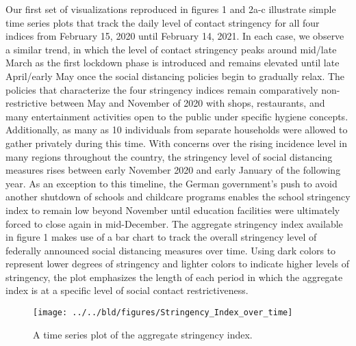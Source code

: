 Our first set of visualizations reproduced in figures 1 and 2a-c illustrate simple time series plots that track the daily level of contact stringency for all four indices from February 15, 2020 until February 14, 2021. In each case, we observe a similar trend, in which the level of contact stringency peaks around mid/late March as the first lockdown phase is introduced and remains elevated until late April/early May once the social distancing policies begin to gradually relax. The policies that characterize the four stringency indices remain comparatively non-restrictive between May and November of 2020 with shops, restaurants, and many entertainment activities open to the public under specific hygiene concepts. Additionally, as many as 10 individuals from separate households were allowed to gather privately during this time. With concerns over the rising incidence level in many regions throughout the country, the stringency level of social distancing measures rises between early November 2020 and early January of the following year. As an exception to this timeline, the German government’s push to avoid another shutdown of schools and childcare programs enables the school stringency index to remain low beyond November until education facilities were ultimately forced to close again in mid-December. The aggregate stringency index available in figure 1 makes use of a bar chart to track the overall stringency level of federally announced social distancing measures over time. Using dark colors to represent lower degrees of stringency and lighter colors to indicate higher levels of stringency, the plot emphasizes the length of each period in which the aggregate index is at a specific level of social contact restrictiveness.

\begin{figure}[H]
      \centering
      \texttt{[image: ../../bld/figures/Stringency\_Index\_over\_time]}
      \label{fig:five over x}
      \caption{A time series plot of the aggregate stringency index.}
      \label{fig:aggindex}
\end{figure}

